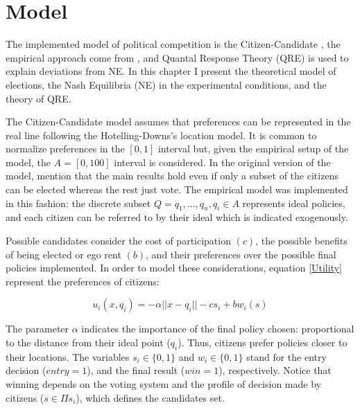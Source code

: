 
\chapter{Model}

The implemented model of political competition is the Citizen-Candidate \cite{Osborne1996}, the empirical approach come from , and Quantal Response Theory (QRE) is used to explain deviations from NE.
In this chapter I present the theoretical model of elections, the Nash Equilibria (NE) in the experimental conditions, and the theory of QRE.

The Citizen-Candidate model assumes that preferences can be represented in the real line following the Hotelling-Downs's location model. 
It is common to normalize preferences in the $[0,1]$ interval but, given the empirical setup of the model, the $A=[0,100]$ interval is considered.
In the original version of the model,  mention that the main results hold even if only a subset of the citizens can be elected whereas the rest just vote. 
The empirical model was implemented in this fashion: the discrete subset $Q={q_1, ..., q_n}, q_i \in A$ represents ideal policies, and each citizen can be referred to by their ideal which is indicated exogenously. 

Possible candidates consider the cost of participation $(c)$, the possible benefits of being elected or ego rent $(b)$, and their preferences over the possible final policies implemented. 
In order to model these considerations, equation \ref{Utility} 
represent the preferences of citizens:

\begin{equation}\label{Utility}
	u_i(x,q_i)= -\alpha||x-q_i|| - cs_i + bw_i(s)
\end{equation}

The parameter $\alpha$ indicates the importance of the final policy chosen: proportional to the distance from their ideal point ($q_i$). Thus, citizens prefer policies closer to their locations. The variables $s_i \in \{0,1\}$ and $w_i \in \{0,1\}$ stand for the entry decision ($entry=1$), and the final result ($win=1$), respectively. 
Notice that winning depends on the voting system and the profile of decision made by citizens ($s \in \Pi s_i$), which defines the candidates set.

